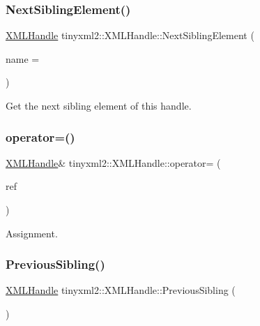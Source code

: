\subsubsection{\texorpdfstring{Next\+Sibling\+Element()}{NextSiblingElement()}}
{\footnotesize\ttfamily \mbox{\hyperlink{classtinyxml2_1_1_x_m_l_handle}{X\+M\+L\+Handle}} tinyxml2\+::\+X\+M\+L\+Handle\+::\+Next\+Sibling\+Element (\begin{DoxyParamCaption}\item[{const char $\ast$}]{name = {} }\end{DoxyParamCaption})\hspace{0.3cm}{\ttfamily [inline]}}



Get the next sibling element of this handle. 

\mbox{\label{classtinyxml2_1_1_x_m_l_handle_a75b908322bb4b83be3281b6845252b20}} 
\subsubsection{\texorpdfstring{operator=()}{operator=()}}
{\footnotesize\ttfamily \mbox{\hyperlink{classtinyxml2_1_1_x_m_l_handle}{X\+M\+L\+Handle}}\& tinyxml2\+::\+X\+M\+L\+Handle\+::operator= (\begin{DoxyParamCaption}\item[{const \mbox{\hyperlink{classtinyxml2_1_1_x_m_l_handle}{X\+M\+L\+Handle}} \&}]{ref }\end{DoxyParamCaption})\hspace{0.3cm}{\ttfamily [inline]}}



Assignment. 

\mbox{\label{classtinyxml2_1_1_x_m_l_handle_a428374e756f4db4cbc287fec64eae02c}} 
\subsubsection{\texorpdfstring{Previous\+Sibling()}{PreviousSibling()}}
{\footnotesize\ttfamily \mbox{\hyperlink{classtinyxml2_1_1_x_m_l_handle}{X\+M\+L\+Handle}} tinyxml2\+::\+X\+M\+L\+Handle\+::\+Previous\+Sibling (\begin{DoxyParamCaption}{ }\end{DoxyParamCaption})\hspace{0.3cm}{\ttfamily [inline]}}



